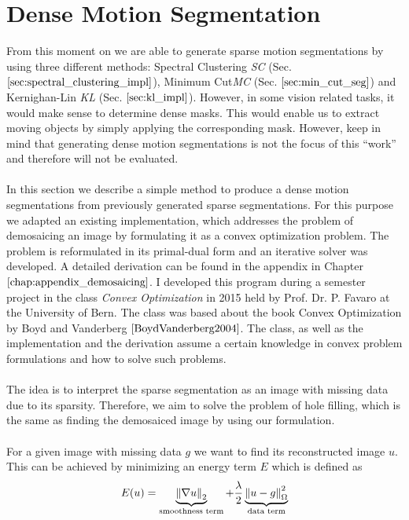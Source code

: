 \section{Dense Motion Segmentation}
\label{sec:dense_motion_segmentation}
From this moment on we are able to generate sparse motion segmentations by using three different methods: Spectral Clustering \textit{SC} (Sec. $\ref{sec:spectral_clustering_impl}$), Minimum Cut\textit{MC} (Sec. $\ref{sec:min_cut_seg}$) and Kernighan-Lin \textit{KL} (Sec. $\ref{sec:kl_impl}$). However, in some vision related tasks, it would make sense to determine dense masks. This would enable us to extract moving objects by simply applying the corresponding mask. However, keep in mind that generating dense motion segmentations is not the focus of this \enquote{work} and therefore will not be evaluated. \\ \\
In this section we describe a simple method to produce a dense motion segmentations from previously generated sparse segmentations. For this purpose we adapted an existing implementation, which addresses the problem of demosaicing an image by formulating it as a convex optimization problem. The problem is reformulated in its primal-dual form and an iterative solver was developed. A detailed derivation can be found in the appendix in Chapter $\ref{chap:appendix_demosaicing}$. I developed this program during a semester project in the class \textit{Convex Optimization} in 2015 held by Prof. Dr. P. Favaro at the University of Bern. The class was based about the book Convex Optimization by Boyd and Vanderberg $\cite{BoydVanderberg2004}$. The class, as well as the implementation and the derivation assume a certain knowledge in convex problem formulations and how to solve such problems. \\ \\
The idea is to interpret the sparse segmentation as an image with missing data due to its sparsity. Therefore, we aim to solve the problem of hole filling, which is the same as finding the demosaiced image by using our formulation. \\ \\
For a given image with missing data $g$ we want to find its reconstructed image $u$. This can be achieved by minimizing an energy term $E$ which is defined as 
\begin{equation}
	E(u) = \underbrace{\left\lVert\nabla u\right\rVert_2}_{\text{smoothness term}} + \frac{\lambda}{2} \underbrace{\left\lVert u - g\right\rVert^2_{\Omega}}_{\text{data term}}	
\end{equation}
